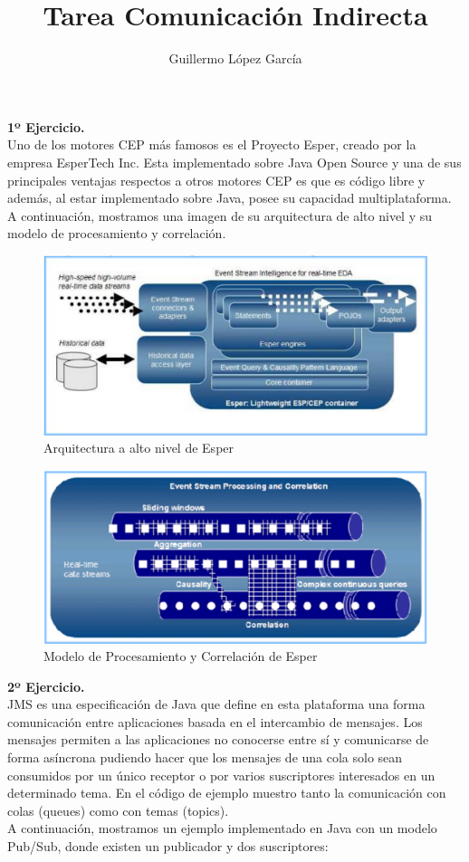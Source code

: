 \documentclass{article}
\title{Tarea Comunicación Indirecta}
\author{Guillermo López García}
\begin{document}
\maketitle

\textbf{1º Ejercicio.}\\
Uno de los motores CEP más famosos es el Proyecto Esper, creado por la empresa
EsperTech Inc. Esta implementado sobre Java Open Source y una de sus principales
ventajas respectos a otros motores CEP es que es código libre y además, al estar
implementado sobre Java, posee su capacidad multiplataforma. A continuación,
mostramos una imagen de su arquitectura de alto nivel y su modelo de procesamiento
y correlación.

\begin{figure}[H]
\centering
\includegraphics[width=0.7\linewidth]{./arquitectura_cep}
\caption{Arquitectura a alto nivel de Esper}
\end{figure}

\begin{figure}[H]
\centering
\includegraphics[width=0.7\linewidth]{./modelo_cep}
\caption{Modelo de Procesamiento y Correlación de Esper}
\end{figure}

\textbf{2º Ejercicio.}\\
JMS es una especificación de Java que define en esta plataforma una forma comunicación entre aplicaciones basada en el intercambio de mensajes. Los mensajes permiten a las aplicaciones no conocerse entre sí y comunicarse de forma asíncrona pudiendo hacer que los mensajes de una cola solo sean consumidos por un único receptor o por varios suscriptores interesados en un determinado tema. En el código de ejemplo muestro tanto la comunicación con colas (queues) como con temas (topics).
\\
A continuación, mostramos un ejemplo implementado en Java con un modelo Pub/Sub,
donde existen un publicador y dos suscriptores:
\end{document}
